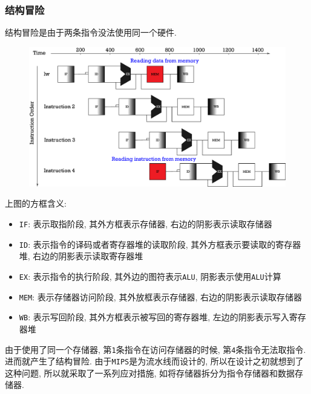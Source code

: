 \subsubsection{结构冒险}
结构冒险是由于两条指令没法使用同一个硬件.
\begin{figure}[H]
\centering
\includegraphics[scale=.4]{img/figure40.pdf}
\end{figure}
上图的方框含义:
\begin{itemize}
\item \verb|IF|: 表示取指阶段, 其外方框表示存储器, 右边的阴影表示读取存储器
\item \verb|ID|: 表示指令的译码或者寄存器堆的读取阶段, 其外方框表示要读取的寄存器堆, 右边的阴影表示读取寄存器堆
\item \verb|EX|: 表示指令的执行阶段, 其外边的图符表示\verb|ALU|, 阴影表示使用\verb|ALU|计算
\item \verb|MEM|: 表示存储器访问阶段, 其外放框表示存储器, 右边的阴影表示读取存储器
\item \verb|WB|: 表示写回阶段, 其外方框表示被写回的寄存器堆, 左边的阴影表示写入寄存器堆
\end{itemize}\par
由于使用了同一个存储器, 第\verb|1|条指令在访问存储器的时候, 第\verb|4|条指令无法取指令. 进而就产生了结构冒险. 由于\verb|MIPS|是为流水线而设计的, 所以在设计之初就想到了这种问题, 所以就采取了一系列应对措施, 如将存储器拆分为指令存储器和数据存储器.
